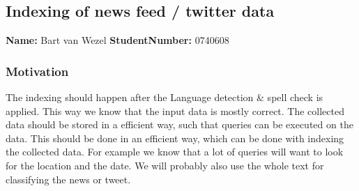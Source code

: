 \subsection{Indexing of news feed / twitter data   }
\textbf{Name:} Bart van Wezel  \textbf{StudentNumber:} 0740608

\subsubsection*{Motivation}
The indexing should happen after the Language detection \& spell check is applied. This way we know that the input data is mostly correct.  The collected data should be stored in a efficient way, such that queries can be executed on the data. This should be done in an efficient way, which can be done with indexing the collected data. 
For example we know that a lot of queries will want to look for the location and the date. 
We will probably also use the whole text for classifying the news or tweet. 

